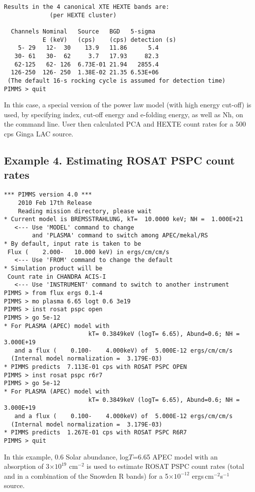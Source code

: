 \begin{verbatim}
Results in the 4 canonical XTE HEXTE bands are:
             (per HEXTE cluster)

  Channels Nominal   Source   BGD   5-sigma
           E (keV)   (cps)    (cps) detection (s)
    5- 29   12-  30    13.9   11.86      5.4
   30- 61   30-  62     3.7   17.93     82.3
   62-125   62- 126  6.73E-01 21.94   2855.4
  126-250  126- 250  1.38E-02 21.35 6.53E+06
 (The default 16-s rocking cycle is assumed for detection time)
PIMMS > quit
\end{verbatim}

In this case, a special version of the power law model (with high
energy cut-off) is used, by specifying index, cut-off energy and
e-folding energy, as well as Nh, on the command line.  User then
calculated PCA and HEXTE count rates for a 500 cps Ginga LAC source.

\subsection*{Example 4. Estimating ROSAT PSPC count rates}

\begin{verbatim}
*** PIMMS version 4.0 ***
    2010 Feb 17th Release
    Reading mission directory, please wait
* Current model is BREMSSTRAHLUNG, kT=  10.0000 keV; NH =  1.000E+21
   <--- Use 'MODEL' command to change
        and 'PLASMA' command to switch among APEC/mekal/RS
* By default, input rate is taken to be
 Flux (    2.000-   10.000 keV) in ergs/cm/cm/s
   <--- Use 'FROM' command to change the default
* Simulation product will be
 Count rate in CHANDRA ACIS-I
   <--- Use 'INSTRUMENT' command to switch to another instrument
PIMMS > from flux ergs 0.1-4
PIMMS > mo plasma 6.65 logt 0.6 3e19
PIMMS > inst rosat pspc open
PIMMS > go 5e-12
* For PLASMA (APEC) model with
                        kT= 0.3849keV (logT= 6.65), Abund=0.6; NH =  3.000E+19
   and a flux (    0.100-    4.000keV) of  5.000E-12 ergs/cm/cm/s
  (Internal model normalization =  3.179E-03)
* PIMMS predicts  7.113E-01 cps with ROSAT PSPC OPEN
PIMMS > inst rosat pspc r6r7
PIMMS > go 5e-12
* For PLASMA (APEC) model with
                        kT= 0.3849keV (logT= 6.65), Abund=0.6; NH =  3.000E+19
   and a flux (    0.100-    4.000keV) of  5.000E-12 ergs/cm/cm/s
  (Internal model normalization =  3.179E-03)
* PIMMS predicts  1.267E-01 cps with ROSAT PSPC R6R7
PIMMS > quit
\end{verbatim}

In this example, 0.6 Solar abundance, log$T$=6.65 APEC model with
an absorption of 3$\times10^{19}$ cm$^{-2}$ is used to estimate ROSAT PSPC
count rates (total and in a combination of the Snowden R bands) for a
5$\times 10^{-12}$ ergs\,cm$^{-2}$s$^{-1}$ source.

